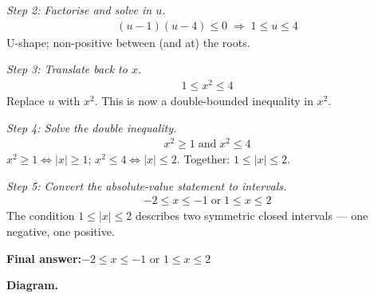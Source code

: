 \documentclass[11pt]{article}
\begin{document}
\textit{Step 2: Factorise and solve in \( u \).}
\[\begin{gathered}
(u - 1)(u - 4) \leq 0 \;\Longrightarrow\; 1 \leq u \leq 4
\end{gathered}\]
U-shape; non-positive between (and at) the roots.

\textit{Step 3: Translate back to \( x \).}
\[\begin{gathered}
1 \leq x^2 \leq 4
\end{gathered}\]
Replace \( u \) with \( x^2 \). This is now a double-bounded inequality in \( x^2 \).

\textit{Step 4: Solve the double inequality.}
\[\begin{gathered}
x^2 \geq 1 \;\text{and}\; x^2 \leq 4
\end{gathered}\]
\( x^2 \geq 1 \Leftrightarrow |x| \geq 1 \); \( x^2 \leq 4 \Leftrightarrow |x| \leq 2 \). Together: \( 1 \leq |x| \leq 2 \).

\textit{Step 5: Convert the absolute-value statement to intervals.}
\[\begin{gathered}
-2 \leq x \leq -1 \;\text{or}\; 1 \leq x \leq 2
\end{gathered}\]
The condition \( 1 \leq |x| \leq 2 \) describes two symmetric closed intervals --- one negative, one positive.

\begin{answerbox}
\textbf{Final answer:}\quad \(\displaystyle -2 \leq x \leq -1\) or \(\displaystyle 1 \leq x \leq 2\)
\end{answerbox}
\textbf{Diagram.}
\end{document}
